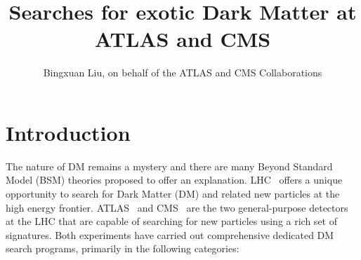 \documentclass{moriond}
\begin{document}
\vspace*{4cm}
\title{Searches for exotic Dark Matter at ATLAS and CMS}


\author{Bingxuan Liu, on behalf of the ATLAS and CMS Collaborations}

\address{Department of Physics, Simon Fraser University, Vancouver, Canada}

\maketitle{}

\section{Introduction}

The nature of DM remains a mystery and there are many Beyond Standard Model
(BSM) theories proposed to offer an explanation. LHC~\cite{LHCRef} offers a
unique opportunity to search for Dark Matter (DM) and related new particles at
the high energy frontier.  ATLAS~\cite{ATLASRef} and CMS~\cite{CMSRef} are the
two general-purpose detectors at the LHC that are capable of searching for new
particles using a rich set of signatures. Both experiments have carried out
comprehensive dedicated DM search programs, primarily in the following
categories: 
\end{document}
